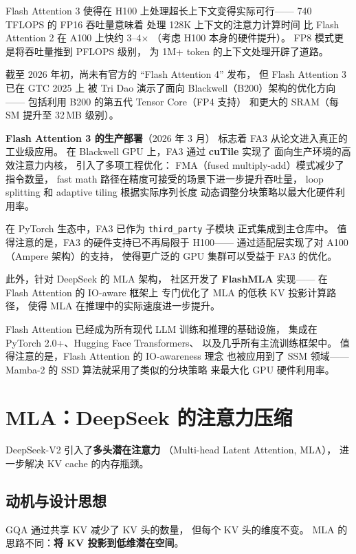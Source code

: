 Flash Attention 3 使得在 H100 上处理超长上下文变得实际可行——
740 TFLOPS 的 FP16 吞吐量意味着
处理 128K 上下文的注意力计算时间
比 Flash Attention 2 在 A100 上快约 3--4$\times$
（考虑 H100 本身的硬件提升）。
FP8 模式更是将吞吐量推到 PFLOPS 级别，
为 1M+ token 的上下文处理开辟了道路。

截至 2026 年初，尚未有官方的 ``Flash Attention 4'' 发布，
但 Flash Attention 3 已在 GTC 2025 上
被 Tri Dao 演示了面向 Blackwell（B200）架构的优化方向——
包括利用 B200 的第五代 Tensor Core（FP4 支持）
和更大的 SRAM（每 SM 提升至 32\,MB 级别）。

\textbf{Flash Attention 3 的生产部署}（2026 年 3 月）
标志着 FA3 从论文进入真正的工业级应用。
在 Blackwell GPU 上，FA3 通过 \textbf{cuTile} 实现了
面向生产环境的高效注意力内核，
引入了多项工程优化：
FMA（fused multiply-add）模式减少了指令数量，
fast math 路径在精度可接受的场景下进一步提升吞吐量，
loop splitting 和 adaptive tiling 根据实际序列长度
动态调整分块策略以最大化硬件利用率。

在 PyTorch 生态中，FA3 已作为 \texttt{third\_party} 子模块
正式集成到主仓库中。
值得注意的是，FA3 的硬件支持已不再局限于 H100——
通过适配层实现了对 A100（Ampere 架构）的支持，
使得更广泛的 GPU 集群可以受益于 FA3 的优化。

此外，针对 DeepSeek 的 MLA 架构，
社区开发了 \textbf{FlashMLA} 实现——
在 Flash Attention 的 IO-aware 框架上
专门优化了 MLA 的低秩 KV 投影计算路径，
使得 MLA 在推理中的实际速度进一步提升。

Flash Attention 已经成为所有现代 LLM 训练和推理的基础设施，
集成在 PyTorch 2.0+、Hugging Face Transformers、
以及几乎所有主流训练框架中。
值得注意的是，Flash Attention 的 IO-awareness 理念
也被应用到了 SSM 领域——
Mamba-2 的 SSD 算法就采用了类似的分块策略
来最大化 GPU 硬件利用率。

\section{MLA：DeepSeek 的注意力压缩}

DeepSeek-V2 引入了\textbf{多头潜在注意力}
（Multi-head Latent Attention, MLA），
进一步解决 KV cache 的内存瓶颈。

\subsection{动机与设计思想}

GQA 通过共享 KV 减少了 KV 头的数量，
但每个 KV 头的维度不变。
MLA 的思路不同：\textbf{将 KV 投影到低维潜在空间}。

